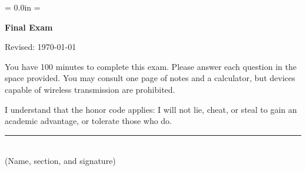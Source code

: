 \documentclass[letterpaper,12pt]{article}
\def\HeadName{Final Exam}
\begin{document}
\parindent = 0.0in
\parskip = \bigskipamount
\thispagestyle{empty}%
\Head

\centerline{\large \bf \HeadName}%
\centerline{Revised:  \today}

\bigskip
You have 100 minutes to complete this exam.  Please answer each question in the space provided.
You may consult one page of notes and a calculator, but devices capable of wireless transmission
are prohibited.

I understand that the honor code applies: I will not lie, cheat, or
steal to gain an academic advantage, or tolerate those who do.

\begin{flushright}
\rule{4in}{0.5pt} \\ (Name, section, and signature)
\end{flushright}
\end{document}
